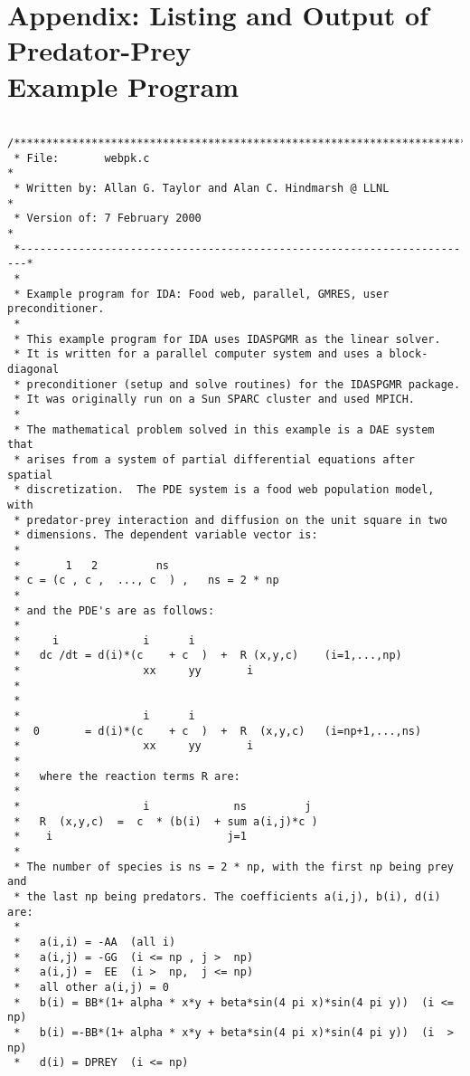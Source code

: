 \documentclass[11pt]{article}
\begin{document}
\newpage

\section{Appendix: Listing and Output of Predator-Prey \\ Example Program}

\small
\begin{verbatim}

/*************************************************************************
 * File:       webpk.c                                                   *
 * Written by: Allan G. Taylor and Alan C. Hindmarsh @ LLNL              *
 * Version of: 7 February 2000                                           *
 *-----------------------------------------------------------------------*
 *
 * Example program for IDA: Food web, parallel, GMRES, user preconditioner.
 *
 * This example program for IDA uses IDASPGMR as the linear solver.
 * It is written for a parallel computer system and uses a block-diagonal 
 * preconditioner (setup and solve routines) for the IDASPGMR package.
 * It was originally run on a Sun SPARC cluster and used MPICH.
 *                                         
 * The mathematical problem solved in this example is a DAE system that 
 * arises from a system of partial differential equations after spatial
 * discretization.  The PDE system is a food web population model, with
 * predator-prey interaction and diffusion on the unit square in two 
 * dimensions. The dependent variable vector is:
 *
 *       1   2         ns
 * c = (c , c ,  ..., c  ) ,   ns = 2 * np
 * 
 * and the PDE's are as follows:
 *
 *     i             i      i
 *   dc /dt = d(i)*(c    + c  )  +  R (x,y,c)    (i=1,...,np)
 *                   xx     yy       i
 *
 *
 *                   i      i      
 *  0       = d(i)*(c    + c  )  +  R  (x,y,c)   (i=np+1,...,ns)
 *                   xx     yy       i
 *
 *   where the reaction terms R are:
 *
 *                   i             ns         j  
 *   R  (x,y,c)  =  c  * (b(i)  + sum a(i,j)*c )
 *    i                           j=1
 *
 * The number of species is ns = 2 * np, with the first np being prey and
 * the last np being predators. The coefficients a(i,j), b(i), d(i) are:
 *
 *   a(i,i) = -AA  (all i)
 *   a(i,j) = -GG  (i <= np , j >  np)
 *   a(i,j) =  EE  (i >  np,  j <= np)
 *   all other a(i,j) = 0
 *   b(i) = BB*(1+ alpha * x*y + beta*sin(4 pi x)*sin(4 pi y))  (i <= np)
 *   b(i) =-BB*(1+ alpha * x*y + beta*sin(4 pi x)*sin(4 pi y))  (i  > np)
 *   d(i) = DPREY  (i <= np)

\end{verbatim}
\end{document}

